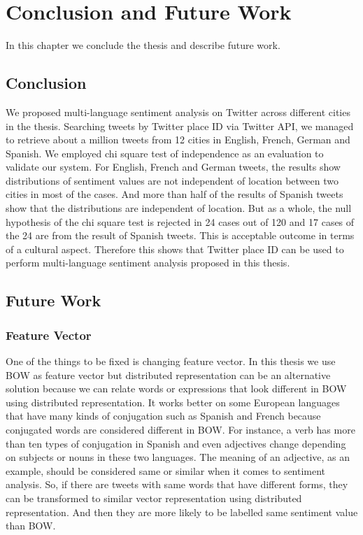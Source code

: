 \chapter{Conclusion and Future Work}
In this chapter we conclude the thesis and describe future work.
\section{Conclusion}
We proposed multi-language sentiment analysis on Twitter across different cities in the thesis.
Searching tweets by Twitter place ID via Twitter API, we managed to retrieve about a million tweets from 12 cities in English, French, German and Spanish.
We employed chi square test of independence as an evaluation to validate our system.
For English, French and German tweets, the results show distributions of sentiment values are not independent of location between two cities in most of the cases.
And more than half of the results of Spanish tweets show that the distributions are independent of location. 
But as a whole, the null hypothesis of the chi square test is rejected in 24 cases out of 120 and 17 cases of the 24 are from the result of Spanish tweets.
This is acceptable outcome in terms of a cultural aspect.
Therefore this shows that Twitter place ID can be used to perform multi-language sentiment analysis proposed in this thesis.


\section{Future Work}
\subsection{Feature Vector}
One of the things to be fixed is changing feature vector.
In this thesis we use BOW as feature vector but distributed representation can be an alternative solution because we can relate words or expressions that look different in BOW using distributed representation.
It works better on some European languages that have many kinds of conjugation such as Spanish and French because conjugated words are considered different in BOW. 
For instance, a verb has more than ten types of conjugation in Spanish and even adjectives change depending on subjects or nouns in these two languages.
The meaning of an adjective, as an example, should be considered same or similar when it comes to sentiment analysis.
So, if there are tweets with same words that have different forms, they can be transformed to similar vector representation using distributed representation.
And then they are more likely to be labelled same sentiment value than BOW.

